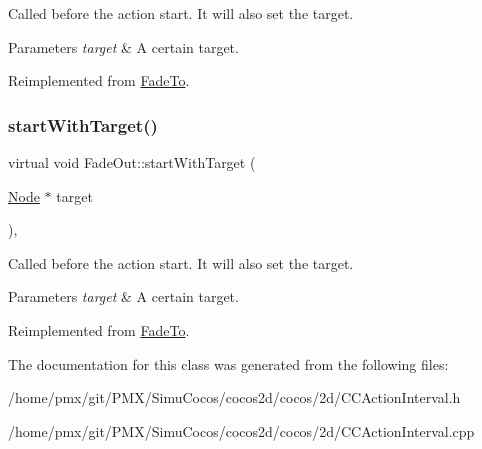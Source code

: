Called before the action start. It will also set the target.


\begin{DoxyParams}{Parameters}
{\em target} & A certain target. \\
\hline
\end{DoxyParams}


Reimplemented from \hyperlink{classFadeTo_a7846758ff3760d099ca70c279c52bde0}{Fade\+To}.

\mbox{\label{classFadeOut_a95f4db5b66b8fea0e41ae9da60c3e730}} 
\subsubsection{\texorpdfstring{start\+With\+Target()}{startWithTarget()}\hspace{0.1cm}{\footnotesize\ttfamily [2/2]}}
{\footnotesize\ttfamily virtual void Fade\+Out\+::start\+With\+Target (\begin{DoxyParamCaption}\item[{\hyperlink{classNode}{Node} $\ast$}]{target }\end{DoxyParamCaption})\hspace{0.3cm}{\ttfamily [override]}, {\ttfamily [virtual]}}

Called before the action start. It will also set the target.


\begin{DoxyParams}{Parameters}
{\em target} & A certain target. \\
\hline
\end{DoxyParams}


Reimplemented from \hyperlink{classFadeTo_a7846758ff3760d099ca70c279c52bde0}{Fade\+To}.



The documentation for this class was generated from the following files\+:\begin{DoxyCompactItemize}
\item 
/home/pmx/git/\+P\+M\+X/\+Simu\+Cocos/cocos2d/cocos/2d/C\+C\+Action\+Interval.\+h\item 
/home/pmx/git/\+P\+M\+X/\+Simu\+Cocos/cocos2d/cocos/2d/C\+C\+Action\+Interval.\+cpp\end{DoxyCompactItemize}
